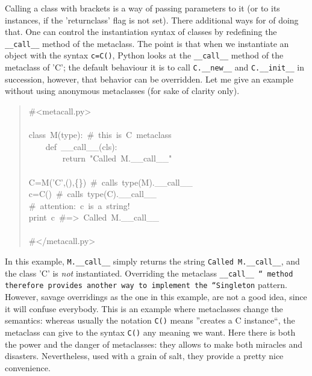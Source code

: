 \documentclass[10pt,english]{article}
\begin{document}
Calling a class with brackets is a way of passing parameters to it (or
to its instances, if the 'returnclass' flag is not set). 
There additional ways for of doing that. 
One can control the instantiation syntax of classes by redefining the 
\texttt{{\_}{\_}call{\_}{\_}} method of the metaclass. The point is that when we instantiate 
an object with the syntax \texttt{c=C()}, Python looks
at the \texttt{{\_}{\_}call{\_}{\_}} method of the metaclass of 'C'; the default behaviour
it is to call \texttt{C.{\_}{\_}new{\_}{\_}} and \texttt{C.{\_}{\_}init{\_}{\_}} in succession, however, that
behavior can be overridden. Let me give an example without using
anonymous metaclasses (for sake of clarity only).
\begin{quote}
\begin{ttfamily}\begin{flushleft}
\mbox{{\#}<metacall.py>}\\
\mbox{}\\
\mbox{class~M(type):~{\#}~this~is~C~metaclass}\\
\mbox{~~~~def~{\_}{\_}call{\_}{\_}(cls):}\\
\mbox{~~~~~~~~return~"Called~M.{\_}{\_}call{\_}{\_}"~}\\
\mbox{}\\
\mbox{C=M('C',(),{\{}{\}})~{\#}~calls~type(M).{\_}{\_}call{\_}{\_}}\\
\mbox{c=C()~{\#}~calls~type(C).{\_}{\_}call{\_}{\_}}\\
\mbox{{\#}~attention:~c~is~a~string!}\\
\mbox{print~c~{\#}=>~Called~M.{\_}{\_}call{\_}{\_}}\\
\mbox{}\\
\mbox{{\#}</metacall.py>}
\end{flushleft}\end{ttfamily}
\end{quote}

In this example, \texttt{M.{\_}{\_}call{\_}{\_}} simply 
returns the string \texttt{Called M.{\_}{\_}call{\_}{\_}}, and the class
'C' is \emph{not} instantiated. Overriding the metaclass
\texttt{{\_}{\_}call{\_}{\_} `` method therefore provides another way to implement
the ``Singleton} pattern. However, savage overridings as the one in
this example, are not a good idea, since it will confuse everybody.
This is an example where metaclasses change the semantics: whereas
usually the notation \texttt{C()} means ''creates a C instance``, the
metaclass can give to the syntax \texttt{C()} any meaning we want.
Here there is both the power and the danger of metaclasses: they
allows to make both miracles and disasters. Nevertheless, used with
a grain of salt, they provide a pretty nice convenience.
\end{document}
